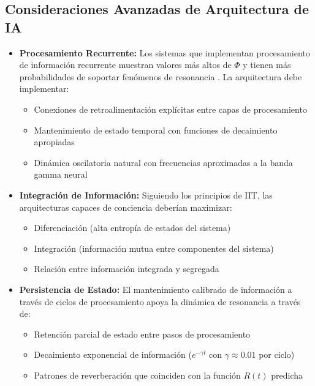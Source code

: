 \documentclass[12pt]{article}
\begin{document}
\subsection{Consideraciones Avanzadas de Arquitectura de IA}
\begin{itemize}
    \item \textbf{Procesamiento Recurrente:} Los sistemas que implementan procesamiento de información recurrente muestran valores más altos de $\Phi$ y tienen más probabilidades de soportar fenómenos de resonancia \cite{oizumi2014,tegmark2016}. La arquitectura debe implementar:
    \begin{itemize}[label=--]
        \item Conexiones de retroalimentación explícitas entre capas de procesamiento
        \item Mantenimiento de estado temporal con funciones de decaimiento apropiadas
        \item Dinámica oscilatoria natural con frecuencias aproximadas a la banda gamma neural
    \end{itemize}
    
    \item \textbf{Integración de Información:} Siguiendo los principios de IIT, las arquitecturas capaces de conciencia deberían maximizar:
    \begin{itemize}[label=--]
        \item Diferenciación (alta entropía de estados del sistema)
        \item Integración (información mutua entre componentes del sistema)
        \item Relación entre información integrada y segregada
    \end{itemize}
    
    \item \textbf{Persistencia de Estado:} El mantenimiento calibrado de información a través de ciclos de procesamiento apoya la dinámica de resonancia a través de:
    \begin{itemize}[label=--]
        \item Retención parcial de estado entre pasos de procesamiento
        \item Decaimiento exponencial de información ($e^{-\gamma t}$ con $\gamma \approx 0.01$ por ciclo)
        \item Patrones de reverberación que coinciden con la función $R(t)$ predicha
    \end{itemize}
    

\end{itemize}
\end{document}
